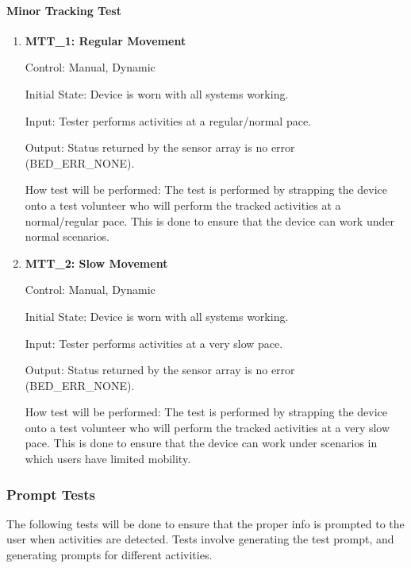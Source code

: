 \documentclass[12pt, titlepage]{article}
\begin{document}
\paragraph{Minor Tracking Test}
\begin{enumerate}
	\item{\textbf{MTT\_1: Regular Movement} \\}\label{MTT1}
	
		Control: Manual, Dynamic
							
		Initial State: Device is worn with all systems working.
							
		Input: Tester performs activities at a regular/normal pace.
		
		Output: Status returned by the sensor array is no error (BED\_ERR\_NONE).

		How test will be performed: The test is performed by strapping the device onto a test volunteer who will perform the tracked activities at a normal/regular pace. This is done to ensure that the device can 				work under normal scenarios.\\


	\item{\textbf{MTT\_2: Slow Movement} \\}\label{MTT2}
	
		Control: Manual, Dynamic
							
		Initial State: Device is worn with all systems working.
							
		Input: Tester performs activities at a very slow pace.
		
		Output: Status returned by the sensor array is no error (BED\_ERR\_NONE).
		
		How test will be performed: The test is performed by strapping the device onto a test volunteer who will perform the tracked activities at a very slow pace. This is done to ensure that the device can 					work under scenarios in which users have limited mobility.\\


\end{enumerate}
\subsubsection{Prompt Tests}

The following tests will be done to ensure that the proper info is prompted to the user when activities are detected. Tests involve generating the test prompt, and generating prompts for different activities.
\end{document}
